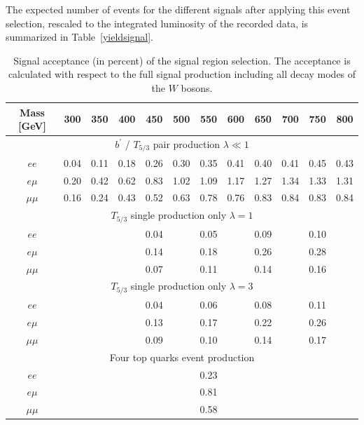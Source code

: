 The expected number of events for the different signals after applying this event selection, rescaled to
the integrated luminosity of the recorded data, is summarized in Table~\ref{yieldsignal}.

\begin{table}[p]
  \begin{center}
    \caption{Signal acceptance (in percent) of the signal region selection. The acceptance is calculated 
      with respect to the full signal production including all decay modes of the $W$ bosons.}\label{effsignal}
    \begin{tabular}{c|c|c|c|c|c|c|c|c|c|c|c}
      \hline\hline
      Mass [GeV] & 300 & 350 & 400 & 450 & 500 & 550 & 600 & 650 & 700 & 750 & 800 \\
      \hline
      \multicolumn{12}{c}{$b^\prime$ / $T_{5/3}$ pair production $\lambda\ll1$} \\
      \hline
      $ee$ & 0.04 & 0.11 & 0.18 & 0.26 & 0.30 & 0.35 & 0.41 & 0.40 & 0.41 & 0.45 & 0.43 \\
      $e\mu$ & 0.20 & 0.42 & 0.62 & 0.83 & 1.02 & 1.09 & 1.17 & 1.27 & 1.34 & 1.33 & 1.31 \\
      $\mu\mu$ & 0.16 & 0.24 & 0.43 & 0.52 & 0.63 & 0.78 & 0.76 & 0.83 & 0.84 & 0.83 & 0.84 \\
      \hline
      \multicolumn{12}{c}{$T_{5/3}$ single production only $\lambda=1$} \\
      \hline
      $ee$ & & & & 0.04 & & 0.05 & & 0.09 & & 0.10 & \\
      $e\mu$ & & & & 0.14 & & 0.18 & & 0.26 & & 0.28 & \\
      $\mu\mu$ & & & & 0.07 & & 0.11 & & 0.14 & & 0.16 & \\
      \hline
      \multicolumn{12}{c}{$T_{5/3}$ single production only $\lambda=3$} \\
      \hline
      $ee$ & & & & 0.04 & & 0.06 & & 0.08 & & 0.11 & \\
      $e\mu$ & & & & 0.13 & & 0.17 & & 0.22 & & 0.26 & \\
      $\mu\mu$ & & & & 0.09 & & 0.10 & & 0.14 & & 0.17 & \\
      \hline
      \multicolumn{12}{c}{Four top quarks event production} \\
      \hline
      $ee$ & \multicolumn{11}{c}{0.23} \\
      $e\mu$ & \multicolumn{11}{c}{0.81} \\
      $\mu\mu$ & \multicolumn{11}{c}{0.58} \\
      \hline
    \end{tabular}


\end{center}
\end{table}
